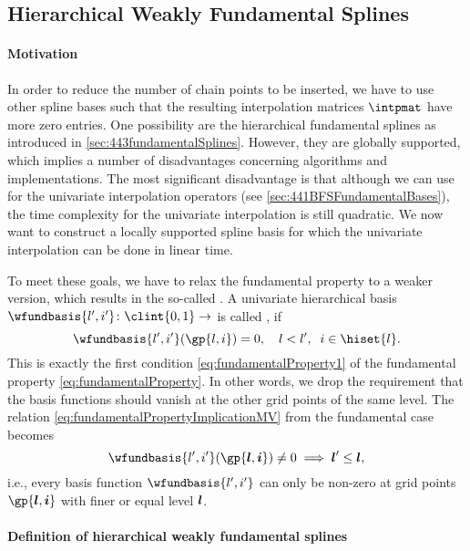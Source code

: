 \subsection{Hierarchical Weakly Fundamental Splines}
\label{sec:454wfs}

\paragraph{Motivation}

In order to reduce the number of chain points to be inserted,
we have to use other spline bases such that
the resulting interpolation matrices $\intpmat$ have more zero entries.
One possibility are the hierarchical fundamental splines
as introduced in \cref{sec:443fundamentalSplines}.
However, they are globally supported, which implies a number
of disadvantages concerning algorithms and implementations.
The most significant disadvantage is that although
we can use \bfs for the univariate interpolation operators
(see \cref{sec:441BFSFundamentalBases}),
the time complexity for the univariate interpolation is still quadratic.
We now want to construct a locally supported spline basis for which
the univariate interpolation can be done in linear time.

To meet these goals, we have to relax the fundamental property
to a weaker version, which results in the so-called
.
A univariate hierarchical basis
$\wfundbasis{l',i'}\colon \clint{0, 1} \to \real$
is called , if
\begin{equation}
  \label{eq:weaklyFundamentalProperty}
  \wfundbasis{l',i'}(\gp{l,i}) = 0,\quad
  l < l',\;\;
  i \in \hiset{l}.
\end{equation}
This is exactly the first condition \eqref{eq:fundamentalProperty1}
of the fundamental property \eqref{eq:fundamentalProperty}.
In other words, we drop the requirement that the basis functions
should vanish at the other grid points of the same level.
The relation \eqref{eq:fundamentalPropertyImplicationMV} from the
fundamental case becomes
\begin{equation}
  \label{eq:weaklyFundamentalPropertyImplicationMV}
  \wfundbasis{l',i'}(\gp{\*l,\*i})
  \not= 0
  \implies
  \*l' \le \*l,
\end{equation}
i.e., every basis function $\wfundbasis{l',i'}$
can only be non-zero at grid points $\gp{\*l,\*i}$ with
finer or equal level ${\boldsymbol{l}}$.

\paragraph{Definition of hierarchical weakly fundamental splines}

